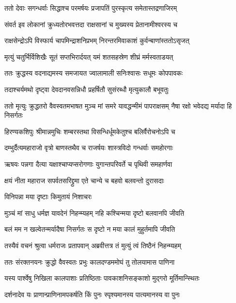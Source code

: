 \twolineshloka
{ततो देवाः सगन्धर्वाः सिद्धाश्च परमर्षयः}
{प्रजापतिं पुरस्कृत्य समेतास्तद्रणाजिरम्} %

\twolineshloka
{संवर्त इव लोकानां क्रुध्यतोरभवत्तदा}
{राक्षसानां च मुख्यस्य प्रेतानामीश्वरस्य च} %

\twolineshloka
{राक्षसेन्द्रोऽपि विस्फार्य चापमिन्द्राशनिप्रभम्}
{निरन्तरमिवाकाशं कुर्वन्बाणांस्ततोऽसृजत्} %

\twolineshloka
{मृत्युं चतुर्भिर्विशिखैः सूतं सप्तभिरार्दयत्}
{यमं शतसहस्रेण शीघ्रं मर्मस्वताडयत्} %

\twolineshloka
{ततः क्रुद्धस्य वदनाद्यमस्य समजायत}
{ज्वालामाली सनिःश्वासः सधूमः कोपपावकः} %

\twolineshloka
{तदाश्चर्यमथो दृष्ट्वा देवदानवसन्निधौ}
{प्रहर्षितौ सुसंरब्धौ मृत्युकालौ बभूवतुः} %

\threelineshloka
{ततो मृत्युः क्रुद्धतरो वैवस्वतमभाषत}
{मुञ्च मां समरे यावद्धन्मीमं पापराक्षसम्}
{नैषा रक्षो भवेदद्य मर्यादा हि निसर्गतः} %

\twolineshloka
{हिरण्यकशिपुः श्रीमान्नमुचिः शम्बरस्तथा}
{विसन्धिर्धूमकेतुश्च बलिर्वैरोचनोऽपि च} %

\twolineshloka
{दम्भुर्दैत्यमहाराजो वृत्रो बाणस्तथैव च}
{राजर्षयः शास्त्रविदो गन्धर्वाः समहोरगाः} %

\twolineshloka
{ऋषयः पन्नगा दैत्या यक्षाश्चाप्यप्सरोगणाः}
{युगान्तपरिवर्ते च पृथिवी समहार्णवा} %

\twolineshloka
{क्षयं नीता महाराज सपर्वतसरिद्द्रुमा}
{एते चान्ये च बहवो बलवन्तो दुरासदाः} %

\onelineshloka
{विनिपन्ना मया दृष्टाः किमुतायं निशाचरः} %

\twolineshloka
{मुञ्चं मां साधु धर्मज्ञ यावदेनं निहन्म्यहम्}
{नहि कश्चिन्मया दृष्टो बलवानपि जीवति} %

\twolineshloka
{बलं मम न खल्वेतन्मर्यादैषा निसर्गतः}
{स दृष्टो न मया कालं मुहुर्तमापि जीवति} %

\twolineshloka
{तस्यैवं वचनं श्रुत्वा धर्मराजः प्रतापवान्}
{अब्रवीत्तत्र तं मुत्युं त्वं तिष्ठैनं निहन्म्यहम्} %

\twolineshloka
{ततः संरक्तनयनः क्रुद्धो वैवस्वतः प्रभुः}
{कालदण्डममोघं तु तोलयामास पाणिना} %

\twolineshloka
{यस्य पार्श्वेषु निखिला कालपाशाः प्रतिष्ठिताः}
{पावकाशनिसङ्काशो मुद्गरो मूर्तिमान्स्थितः} %

\twolineshloka
{दर्शनादेव यः प्राणान्प्राणिनामपकर्षति}
{किं पुनः स्पृश्यमानस्य पात्यमानस्य वा पुनः} %


